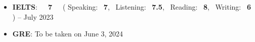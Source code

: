 
\vspace{5pt}
\begin{itemize}
  \item \textbf{IELTS}:\ \ \ \textbf{7}\ \ \ ( Speaking: \ \textbf{7}, \ Listening: \ \textbf{7.5}, \ Reading: \ \textbf{8}, \ Writing: \ \textbf{6} ) --  July 2023
  \item \textbf{GRE}: To be taken on June 3, 2024
\end{itemize}

